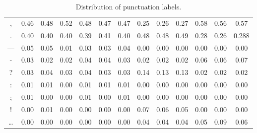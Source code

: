 \documentclass[a4paper]{article}
\begin{document}
\begin{multicols}{2}
\begin{appendices}
\begin{table*}[t]
\begin{tabular}{|c|c|c|c|c|c|c|c|c|c|c|c|c|}
\hline
, & 0.46 & 0.48 & 0.52 & 0.48 & 0.47 & 0.47 & 0.25 & 0.26 & 0.27  &  0.58 & 0.56 & 0.57\\
. & 0.40 & 0.40 & 0.40 & 0.39 & 0.41 & 0.40 & 0.48 & 0.48 & 0.49  &  0.28 & 0.26 & 0.288\\
--- & 0.05 & 0.05 & 0.01 & 0.03 & 0.03 & 0.04 & 0.00 & 0.00 & 0.00  &  0.00 & 0.00 & 0.00\\
- & 0.03 & 0.02 & 0.02 & 0.04 & 0.04 & 0.03 & 0.02 & 0.02 & 0.02  &  0.06 & 0.06 & 0.07\\
? & 0.03 & 0.04 & 0.03 & 0.04 & 0.03 & 0.03 & 0.14 & 0.13 & 0.13  &  0.02 & 0.02 & 0.02\\
: & 0.01 & 0.01 & 0.00 & 0.01 & 0.01 & 0.01 & 0.00 & 0.00 & 0.00  &  0.00 & 0.00 & 0.00\\
; & 0.01 & 0.00 & 0.00 & 0.01 & 0.00 & 0.01 & 0.00 & 0.00 & 0.00  &  0.00 & 0.00 & 0.00\\
! & 0.00 & 0.01 & 0.00 & 0.00 & 0.00 & 0.00 & 0.07 & 0.06 & 0.05  &  0.00 & 0.00 & 0.00\\
… & 0.00 & 0.00 & 0.00 & 0.00 & 0.00 & 0.00 & 0.04 & 0.04 & 0.04  &  0.05 & 0.09 & 0.06\\
\hline
\end{tabular}
\caption{Distribution of punctuation labels.}
\label{table:distribution}
\end{table*}

\end{appendices}


\end{multicols}
\end{document}
